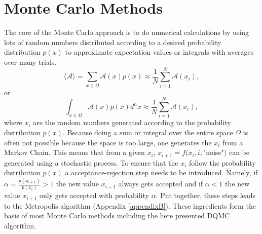 \documentclass [12pt]{report}
\begin{document}
\section{Monte Carlo Methods}
The core of the Monte Carlo approach is to do numerical calculations by using lots of random numbers distributed according to a desired probability distribution $p(x)$ to approximate expectation values or integrals with averages over many trials.
\begin{equation}
\langle \mathcal{A} \rangle = \sum_{x \in \Omega} \mathcal{A}(x) p(x) \approx \frac{1}{N} \sum_{i=1}^N \mathcal{A}(x_i),
\end{equation}
or
\begin{equation}
\int_{x \in \Omega} \mathcal{A}(x) p(x) d^n x \approx \frac{1}{N} \sum_{i=1}^N \mathcal{A}(x_i),
\end{equation}
where $x_i$ are the random numbers generated according to the probability distribution $p(x)$. Because doing a sum or integral over the entire space $\Omega$ is often not possible because the space is too large, one generates the $x_i$ from a Markov Chain. This means that from a given $x_i$, $x_{i+1} = f(x_i,i,$"noise"$)$ can be generated using a stochastic process. To ensure that the $x_i$ follow the probability distribution $p(x)$ a acceptance-rejection step needs to be introduced. Namely, if $\alpha = \frac{p(x_{i+1})}{p(x_i)} > 1$ the new value $x_{i+1}$ always gets accepted and if $\alpha < 1$ the new value $x_{i+1}$ only gets accepted with probability $\alpha$. Put together, these steps leads to the Metropolis algorithm (Appendix \ref{appendixB}). These ingredients form the basis of most Monte Carlo methods including the here presented DQMC algorithm.
\end{document}
